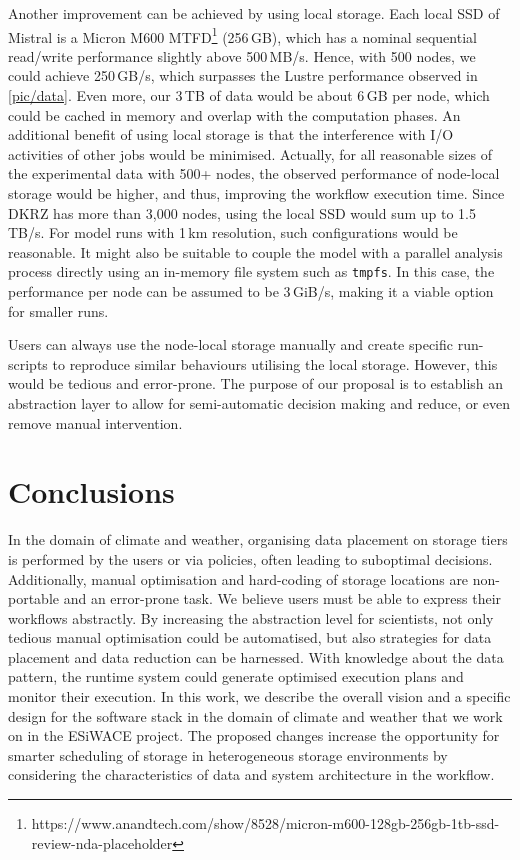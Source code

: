 \documentclass{superfri}
\begin{document}
Another improvement can be achieved by using local storage.
Each local SSD of Mistral is a Micron M600 MTFD\footnote{https://www.anandtech.com/show/8528/micron-m600-128gb-256gb-1tb-ssd-review-nda-placeholder} (256\,GB), which has a nominal sequential read/write performance slightly above 500\,MB/s.
Hence, with 500 nodes, we could achieve 250\,GB/s, which surpasses the Lustre performance observed in \cref{pic/data}.
Even more, our 3\,TB of data would be about 6\,GB per node, which could be cached in memory and overlap with the computation phases.
An additional benefit of using local storage is that the interference with I/O activities of other jobs would be minimised.
Actually, for all reasonable sizes of the experimental data with 500+ nodes, the observed performance of node-local storage would be higher, and thus, improving the workflow execution time.
Since DKRZ has more than 3,000 nodes, using the local SSD would sum up to 1.5\,TB/s.
For model runs with 1\,km resolution, such configurations would be reasonable.
It might also be suitable to couple the model with a parallel analysis process directly using an in-memory file system such as \texttt{tmpfs}.
In this case, the performance per node can be assumed to be 3\,GiB/s, making it a viable option for smaller runs.

Users can always use the node-local storage manually and create specific run-scripts to reproduce similar behaviours utilising the local storage.
However, this would be tedious and error-prone.
The purpose of our proposal is to establish an abstraction layer to allow for semi-automatic decision making and reduce, or even remove manual intervention.

\section*{Conclusions}
\label{sec:conclusions}

In the domain of climate and weather, organising data placement on storage tiers is performed by the users or via policies, often leading to suboptimal decisions.
Additionally, manual optimisation and hard-coding of storage locations are non-portable and an error-prone task.
We believe users must be able to express their workflows abstractly.
By increasing the abstraction level for scientists, not only tedious manual optimisation could be automatised, but also strategies for data placement and data reduction can be harnessed.
With knowledge about the data pattern, the runtime system could generate optimised execution plans and monitor their execution.
In this work, we describe the overall vision and a specific design for the software stack in the domain of climate and weather that we work on in the ESiWACE project.
The proposed changes increase the opportunity for smarter scheduling of storage in heterogeneous storage environments by considering the characteristics of data and system architecture in the workflow.
\end{document}
